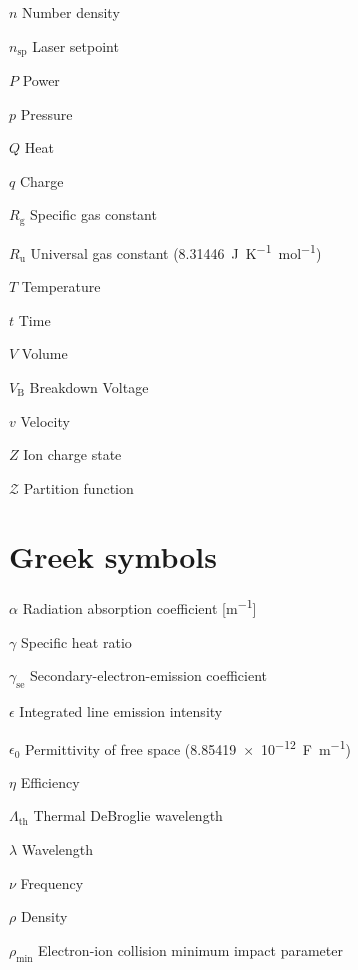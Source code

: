 \begin{multicols}{2}
\begin{nomlist}
        \item[$n$]              Number density 
        \item[$n_\mathrm{sp}$]  Laser setpoint 
        \item[$P$]              Power 
        \item[$p$]              Pressure
        \item[$Q$]              Heat
        \item[$q$]              Charge
        \item[$R_\mathrm{g}$]   Specific gas constant
        \item[$R_\mathrm{u}$]   Universal gas constant (\qty{8.31446}{J.K^{-1}.mol^{-1}})
        \item[$T$]              Temperature
        \item[$t$]              Time
        \item[$V$]              Volume
        \item[$V_\mathrm{B}$]   Breakdown Voltage
        \item[$v$]              Velocity
        \item[$Z$]              Ion charge state
        \item[$\mathcal{Z}$]    Partition function
    \end{nomlist}

    \section*{Greek symbols}
    \begin{nomlist}
        \item[$\alpha$]         Radiation absorption coefficient [\unit{m^{-1}}]
        \item[$\gamma$]         Specific heat ratio
        \item[$\gamma_\mathrm{se}$]         Secondary-electron-emission coefficient
        \item[$\epsilon$]       Integrated line emission intensity 
        \item[$\epsilon_0$]     Permittivity of free space (\qty{8.85419e-12}{F.m^{-1}})
        \item[$\eta$]           Efficiency 
        \item[$\Lambda_\mathrm{th}$]        Thermal DeBroglie wavelength
        \item[$\lambda$]        Wavelength
        \item[$\nu$]            Frequency
        \item[$\rho$]           Density
        \item[$\rho_\mathrm{min}$]  Electron-ion collision minimum impact parameter
    \end{nomlist}


\end{multicols}
